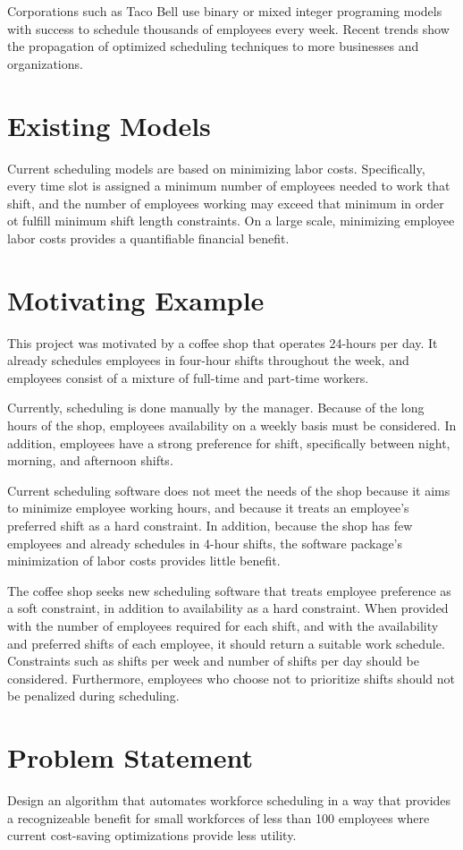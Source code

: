 Corporations such as Taco Bell  use binary or mixed integer programing models \cite{taco} with success to schedule thousands of employees every week. Recent trends show the propagation of optimized scheduling techniques to more businesses and organizations.

\section{Existing Models}

Current scheduling models are based on minimizing labor costs. Specifically, every time slot is assigned a minimum number of employees needed to work that shift, and the number of employees working may exceed that minimum in order ot fulfill minimum shift length constraints.  On a large scale, minimizing employee labor costs provides a quantifiable financial benefit.

\section{Motivating Example}

This project was motivated by a coffee shop that operates 24-hours per day. It already schedules employees in four-hour shifts throughout the week, and employees consist of a mixture of full-time and part-time workers. 

Currently, scheduling is done manually by the manager. Because of the long hours of the shop, employees availability on a weekly basis must be considered. In addition, employees have a strong preference for shift, specifically between night, morning, and afternoon shifts. 

Current scheduling software does not meet the needs of the shop because it aims to minimize employee working hours, and because it treats an employee's preferred shift as a hard constraint. In addition, because the shop has few employees and already schedules in 4-hour shifts, the software package's minimization of labor costs provides little benefit. 

The coffee shop seeks new scheduling software that treats employee preference as a soft constraint, in addition to availability as a hard constraint. When provided with the number of employees required for each shift, and with the availability and preferred shifts of each employee, it should return a suitable work schedule. Constraints such as shifts per week and number of shifts per day should be considered. Furthermore, employees who choose not to prioritize shifts should not be penalized during scheduling. 



\section{Problem Statement}
Design an algorithm that automates workforce scheduling in a way that provides a recognizeable benefit for small workforces of less than 100 employees where current cost-saving optimizations provide less utility. 
